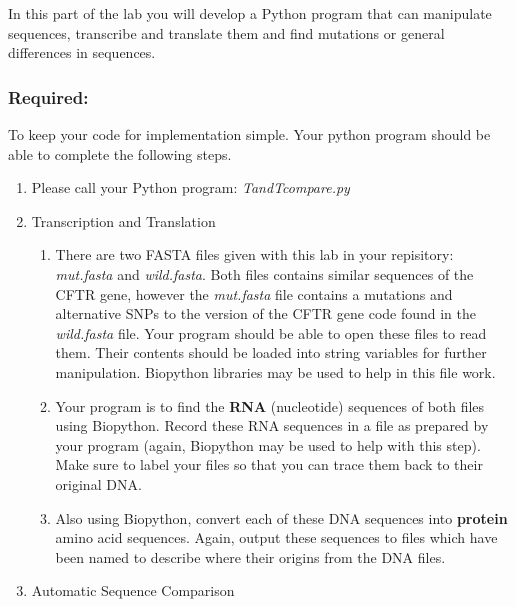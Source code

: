 In this part of the lab you will develop a Python program that can manipulate sequences, transcribe and translate them and find mutations or general differences in sequences. 




\subsubsection*{Required:}
To keep your code for implementation simple. Your python program should be able to complete the following steps.

\begin{enumerate}
\item Please call your Python program: \emph{TandTcompare.py}\\

\item Transcription and Translation

  \begin{enumerate}

	\item There are two FASTA files given with this lab in your repisitory: \emph{mut.fasta} and \emph{wild.fasta}. Both files contains similar sequences  of the CFTR gene, however the \emph{mut.fasta} file contains a mutations and alternative SNPs to the version of the CFTR gene code found in the \emph{wild.fasta} file. Your program should be able to open these files to read them. Their contents should be loaded into string variables for further manipulation. Biopython libraries may be used to help in this file work.

	\item Your program is to find the \textbf{RNA} (nucleotide) sequences of both files using Biopython. Record these RNA sequences in a file as prepared by your program (again, Biopython may be used to help with this step). Make sure to label your files so that you can trace them back to their original DNA.
	
	\item Also using Biopython, convert each of these DNA sequences into \textbf{protein} amino acid sequences. Again, output these sequences to files which have been named to describe where their origins from the DNA files.
	
\end{enumerate}

  \item Automatic Sequence Comparison
  
  \begin{enumerate}
  

\end{enumerate}
\end{enumerate}
